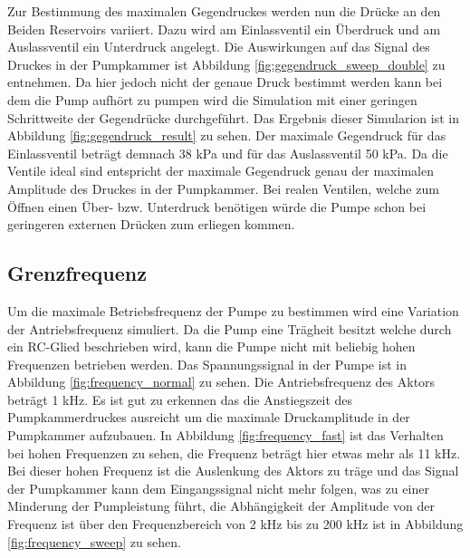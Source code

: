 \documentclass[fontsize=12pt, a4paper]{scrartcl}
\begin{document}
Zur Bestimmung des maximalen Gegendruckes werden nun die Drücke an den Beiden Reservoirs variiert. Dazu wird am Einlassventil ein Überdruck und am Auslassventil ein Unterdruck angelegt. Die Auswirkungen auf das Signal des Druckes in der Pumpkammer ist Abbildung \ref{fig:gegendruck_sweep_double} zu entnehmen. Da hier jedoch nicht der genaue Druck bestimmt werden kann bei dem die Pump aufhört zu pumpen wird die Simulation mit einer geringen Schrittweite der Gegendrücke durchgeführt. Das Ergebnis dieser Simularion ist in Abbildung \ref{fig:gegendruck_result} zu sehen. Der maximale Gegendruck für das Einlassventil beträgt demnach 38 kPa und für das Auslassventil 50 kPa. Da die Ventile ideal sind entspricht der maximale Gegendruck genau der maximalen Amplitude des Druckes in der Pumpkammer. Bei realen Ventilen, welche zum Öffnen einen Über- bzw. Unterdruck benötigen würde die Pumpe schon bei geringeren externen Drücken zum erliegen kommen.

\subsection{Grenzfrequenz}

Um die maximale Betriebsfrequenz der Pumpe zu bestimmen wird eine Variation der Antriebsfrequenz simuliert. Da die Pump eine Trägheit besitzt welche durch ein RC-Glied beschrieben wird, kann die Pumpe nicht mit beliebig hohen Frequenzen betrieben werden. Das Spannungssignal in der Pumpe ist in Abbildung \ref{fig:frequency_normal} zu sehen. Die Antriebsfrequenz des Aktors beträgt 1 kHz. Es ist gut zu erkennen das die Anstiegszeit des Pumpkammerdruckes ausreicht um die maximale Druckamplitude in der Pumpkammer aufzubauen. In Abbildung \ref{fig:frequency_fast} ist das Verhalten bei hohen Frequenzen zu sehen, die Frequenz beträgt hier etwas mehr als 11 kHz. Bei dieser hohen Frequenz ist die Auslenkung des Aktors zu träge und das Signal der Pumpkammer kann dem Eingangssignal nicht mehr folgen, was zu einer Minderung der Pumpleistung führt, die Abhängigkeit der Amplitude von der Frequenz ist über den Frequenzbereich von 2 kHz bis zu 200 kHz ist in Abbildung \ref{fig:frequency_sweep} zu sehen.
 
\end{document}

